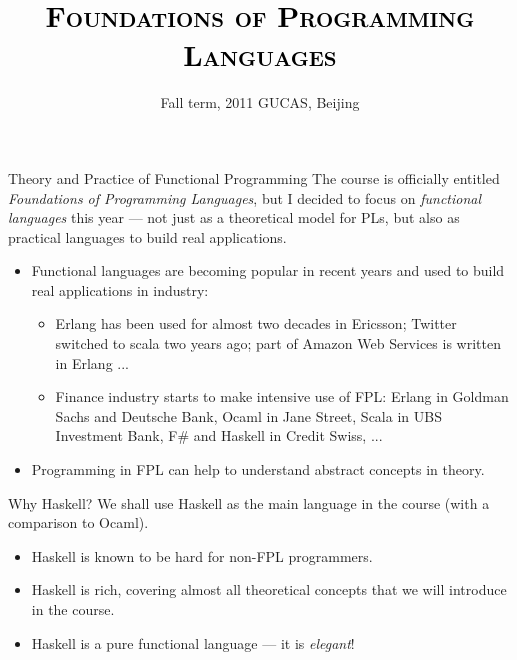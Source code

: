 \documentclass{beamer}
\title[Foundations of Programming Languages]{
{\small \textcolor{black}{\textsc{Foundations of Programming Languages}}} \\[1em]
\comicsansbf{Theory and Practice of Functional Programming}
}
\author[Y. ZHANG]{\monaco{Dr. ZHANG Yu}}
\institute[ISCAS]{Institute of Software, Chinese Academy of Sciences}
\date[GUCAS 2011]{Fall term, 2011 \qquad GUCAS, Beijing}
\begin{document}
\begin{frame}
\titlepage
\end{frame}


\begin{frame}{Theory and Practice of Functional Programming}
The course is officially entitled {\em Foundations of Programming Languages}, but I decided to focus on 
\emph{functional languages} this year --- not just as a theoretical model for PLs, but also as practical languages 
to build real applications.
\begin{itemize}
\item Functional languages are becoming popular in recent years and used to build real applications in industry:
\begin{itemize}
\item Erlang has been used for almost two decades in Ericsson; Twitter switched to scala two years ago;  
  part of Amazon Web Services is written in Erlang ...
\item Finance industry starts to make intensive use of FPL: 
  Erlang in Goldman Sachs and Deutsche Bank, Ocaml in Jane Street, Scala in UBS Investment Bank, 
  F\# and Haskell in Credit Swiss, ...
\end{itemize}
\item Programming in FPL can help to understand abstract concepts in theory.
\end{itemize}
\end{frame}

\begin{frame}{Why Haskell?}
We shall use Haskell as the main language in the course (with a comparison to Ocaml).
\begin{itemize}
\item Haskell is known to be hard for non-FPL programmers.
\item Haskell is rich, covering almost all theoretical concepts that we will introduce in the course.
\item Haskell is a pure functional language --- it is \emph{elegant}!
\end{itemize}
\end{frame}
\end{document}
